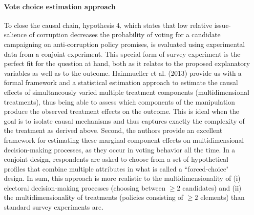 \documentclass[11pt]{article}
\begin{document}
\paragraph{Vote choice estimation approach}
To close the causal chain, hypothesis 4, which states that low relative issue-salience of corruption decreases the probability of voting for a candidate campaigning on anti-corruption policy promises, is evaluated using experimental data from a conjoint experiment. This special form of survey experiment is the perfect fit for the question at hand, both as it relates to the proposed explanatory variables as well as to the outcome. Hainmueller et al. (2013) provide us with a formal framework and a statistical estimation approach to estimate the causal effects of simultaneously varied multiple treatment components (multidimensional treatments), thus being able to assess which components of the manipulation produce the observed treatment effects on the outcome. This is ideal when the goal is to isolate causal mechanisms and thus captures exactly the complexity of the treatment as derived above. Second, the authors provide an excellent framework for estimating these marginal component effects on multidimensional decision-making processes, as they occur in voting behavior all the time. In a conjoint design, respondents are asked to choose from a set of hypothetical profiles that combine multiple attributes in what is called a “forced-choice" design. In sum, this approach is more realistic to the multidimensionality of (i) electoral decision-making processes (choosing between $\geq 2$ candidates) and (ii) the multidimensionality of treatments (policies consisting of $\geq 2$ elements) than standard survey experiments are.
\end{document}
